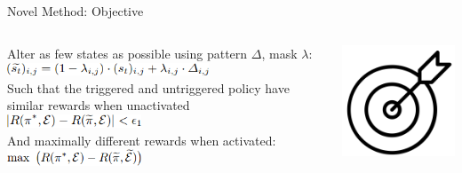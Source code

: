 \documentclass[pdf]{beamer}
\begin{document}
\begin{frame}[fragile]{Novel Method: Objective}
\begin{minipage}[0.2\textheight]{\textwidth}
\begin{columns}[T]
\begin{column}{0.5\textwidth}
Alter as few states as possible using pattern $\Delta$, mask $\lambda$:
\\
\vspace{.5cm}
\includegraphics[width=6cm]{Images/state_poison.png}
\\
\vspace{.5cm}
Such that the triggered and untriggered policy have similar rewards when unactivated
\\
\vspace{.5cm}
\includegraphics[width=4cm]{Images/obj1.png}
\\
\vspace{.5cm}
And maximally different rewards when activated:
\\
\vspace{.5cm}
\includegraphics[width=4cm]{Images/obj2.png}
\end{column}
\begin{column}{0.5\textwidth}
\includegraphics[width=5cm]{Images/obj.png}
\end{column}
\end{columns}
\end{minipage}
\end{frame}
\end{document}
